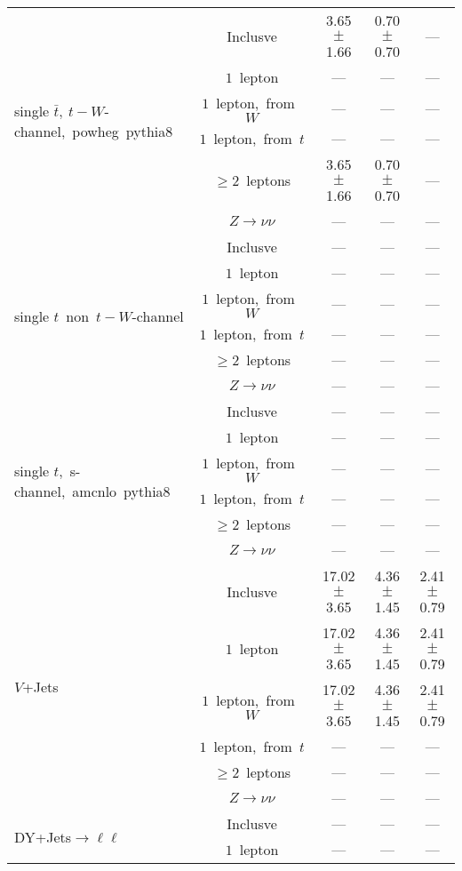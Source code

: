 \documentclass{article}
\begin{document}
\begin{longtable}{|l|c|c|c|c|}
\hline 
\multirow{6}{*}{single $\bar{t},~t-W$-channel,~powheg~pythia8} & Inclusve  & 3.65 $\pm$ 1.66  & 0.70 $\pm$ 0.70  & --- \\* 
 & $1$~lepton  & ---  & ---  & --- \\* 
 & $1$~lepton,~from~$W$  & ---  & ---  & --- \\* 
 & $1$~lepton,~from~$t$  & ---  & ---  & --- \\* 
 & $\ge2$~leptons  & 3.65 $\pm$ 1.66  & 0.70 $\pm$ 0.70  & --- \\* 
 & $Z\rightarrow\nu\nu$  & ---  & ---  & --- \\* 
\hline 
\multirow{6}{*}{single $t$~non~$t-W$-channel} & Inclusve  & ---  & ---  & --- \\* 
 & $1$~lepton  & ---  & ---  & --- \\* 
 & $1$~lepton,~from~$W$  & ---  & ---  & --- \\* 
 & $1$~lepton,~from~$t$  & ---  & ---  & --- \\* 
 & $\ge2$~leptons  & ---  & ---  & --- \\* 
 & $Z\rightarrow\nu\nu$  & ---  & ---  & --- \\* 
\hline 
\multirow{6}{*}{single $t$,~s-channel,~amcnlo~pythia8} & Inclusve  & ---  & ---  & --- \\* 
 & $1$~lepton  & ---  & ---  & --- \\* 
 & $1$~lepton,~from~$W$  & ---  & ---  & --- \\* 
 & $1$~lepton,~from~$t$  & ---  & ---  & --- \\* 
 & $\ge2$~leptons  & ---  & ---  & --- \\* 
 & $Z\rightarrow\nu\nu$  & ---  & ---  & --- \\* 
\hline 
\multirow{6}{*}{$V$+Jets} & Inclusve  & 17.02 $\pm$ 3.65  & 4.36 $\pm$ 1.45  & 2.41 $\pm$ 0.79 \\* 
 & $1$~lepton  & 17.02 $\pm$ 3.65  & 4.36 $\pm$ 1.45  & 2.41 $\pm$ 0.79 \\* 
 & $1$~lepton,~from~$W$  & 17.02 $\pm$ 3.65  & 4.36 $\pm$ 1.45  & 2.41 $\pm$ 0.79 \\* 
 & $1$~lepton,~from~$t$  & ---  & ---  & --- \\* 
 & $\ge2$~leptons  & ---  & ---  & --- \\* 
 & $Z\rightarrow\nu\nu$  & ---  & ---  & --- \\* 
\hline 
\multirow{6}{*}{DY+Jets$\rightarrow\ell\ell$} & Inclusve  & ---  & ---  & --- \\* 
 & $1$~lepton  & ---  & ---  & --- \\* 

\end{longtable}
\end{document}
